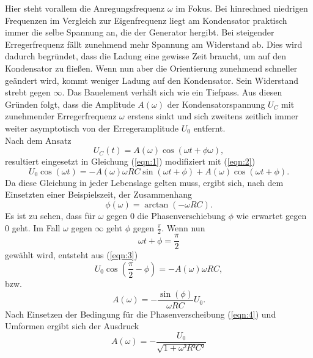 Hier steht vorallem die Anregungsfrequenz $\omega$ im Fokus.
Bei hinrechned niedrigen Frequenzen im Vergleich zur Eigenfrequenz liegt am Kondensator praktisch immer die selbe Spannung an, die der Generator hergibt.
Bei steigender Erregerfrequenz fällt zunehmend mehr Spannung am Widerstand ab.
Dies wird dadurch begründet, dass die Ladung eine gewisse Zeit braucht, um auf den Kondensator zu fließen.
Wenn nun aber die Orientierung zunehmend schneller geändert wird, kommt weniger Ladung auf den Kondensator.
Sein Widerstand strebt gegen $\infty$.
Das Bauelement verhält sich wie ein Tiefpass.
Aus diesen Gründen folgt, dass die Amplitude $A(\omega)$ der Kondensatorspannung $U_C$ mit zunehmender Erregerfrequenz $\omega$ erstens sinkt und sich zweitens zeitlich immer weiter asymptotisch von der Erregeramplitude $U_0$ entfernt.\\
Nach dem Ansatz
\begin{equation}
  U_C(t) = A(\omega)\cos(\omega t+\phi{\omega}),
\end{equation}
resultiert eingesetzt in Gleichung (\ref{eqn:1}) modifiziert mit (\ref{eqn:2})
\begin{equation}
  U_0\cos(\omega t) = -A(\omega)\omega RC\sin(\omega t + \phi) + A(\omega)\cos(\omega t+\phi). \label{eqn:3}
\end{equation}
Da diese Gleichung in jeder Lebenslage gelten muss, ergibt sich, nach dem Einsetzten einer Beispielszeit, der Zusammenhang
\begin{equation}
  \phi(\omega) = \arctan(-\omega RC). \label{eqn:4}
\end{equation}
Es ist zu sehen, dass für $\omega$ gegen $0$ die Phasenverschiebung $\phi$ wie erwartet gegen $0$ geht.
Im Fall $\omega$ gegen $\infty$ geht $\phi$ gegen $\frac{\pi}{2}$.
Wenn nun
\begin{equation}
  \omega t + \phi = \frac{\pi}{2}
\end{equation}
gewählt wird, entsteht aus (\ref{eqn:3})
\begin{equation}
  U_0\cos(\frac{\pi}{2} - \phi) = -A(\omega)\omega RC,
\end{equation}
bzw.
\begin{equation}
  A(\omega) = -\frac{\sin(\phi)}{\omega RC}U_0.
\end{equation}
Nach Einsetzen der Bedingung für die Phasenverscheibung (\ref{eqn:4}) und Umformen ergibt sich der Ausdruck
\begin{equation}
  A(\omega) = -\frac{U_0}{\sqrt{1+\omega²R²C²}} \label{fuck1}
\end{equation}
